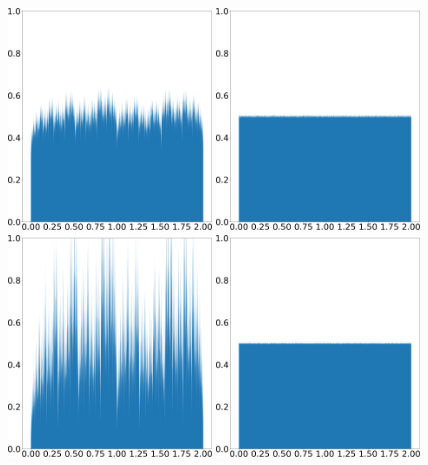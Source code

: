 \documentclass[preprint,12pt]{elsarticle}
\begin{document}
\begin{figure}
    \centering
    \includegraphics[width=0.48\textwidth]{tent_wave_shadow_density_0.05.png}
    \hspace{0.02\textwidth}
    \includegraphics[width=0.48\textwidth]{tent_wave_physical_density_0.05.png}
    \\ \vspace{0.02\textwidth}
    \includegraphics[width=0.48\textwidth]{tent_wave_shadow_density_0.2.png}
    \hspace{0.02\textwidth}
    \includegraphics[width=0.48\textwidth]{tent_wave_physical_density_0.2.png}

\end{figure}
\end{document}
